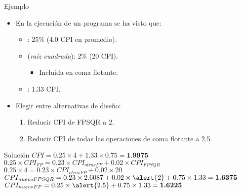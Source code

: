 \begin{frame}[t]{Ejemplo}
\begin{itemize}
  \item En la ejecución de un programa se ha visto que:
    \begin{itemize}
      \item {}: 25\% (4.0 CPI en promedio).
      \item {} (\emph{raíz cuadrada}): 2\% (20 CPI).
        \begin{itemize}
          \item \alert{Incluida en coma flotante.}
        \end{itemize}
      \item {}: 1.33 CPI.
    \end{itemize}
  \item Elegir entre alternativas de diseño:
    \begin{enumerate}[a]
      \item Reducir CPI de FPSQR a 2.
      \item Reducir CPI de todas las operaciones de coma flotante a 2.5.
    \end{enumerate}
\end{itemize}
\end{frame}

\begin{frame}[t]{Solución}
\begin{math}
CPI = 0.25 \times 4 + 1.33 \times 0.75 = \textbf{1.9975}
\end{math}
\begin{math}
0.25 \times CPI_{FP} = 0.23 \times CPI_{otrasFP} + 0.02 \times CPI_{FPSQR}
\end{math}
\pause
\begin{math}
0.25 \times 4 = 0.23 \times CPI_{otrasFP} + 0.02 \times 20
\end{math}
\pause
{}
\begin{math}
CPI_{nuevoFPSQR} = 0.23 \times 2.6087 + 0.02 \times \alert{2} + 0.75 \times 1.33 = \textbf{1.6375}
\end{math}
\pause
\begin{math}
CPI_{nuevoFP} = 0.25 \times \alert{2.5} + 0.75 \times 1.33 = \textbf{1.6225}
\end{math}
\end{frame}
